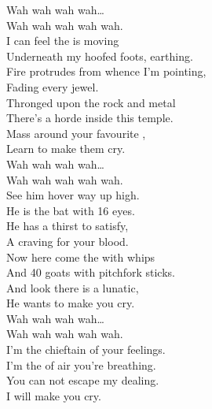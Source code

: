 


Wah wah wah wah… \\
Wah wah wah wah wah. \\

I can feel the  is moving \\
Underneath my hoofed foots, earthing. \\
Fire protrudes from whence I'm pointing, \\
Fading every jewel. \\

Thronged upon the rock and metal \\
There's a horde inside this temple. \\
Mass around your favourite , \\
Learn to make them cry. \\

Wah wah wah wah… \\
Wah wah wah wah wah. \\

See him hover way up high. \\
He is the bat with 16 eyes. \\
He has a thirst to satisfy, \\
A craving for your blood. \\

Now here come the  with whips \\
And 40 goats with pitchfork sticks. \\
And look there is a lunatic, \\
He wants to make you cry. \\

Wah wah wah wah… \\
Wah wah wah wah wah. \\

I'm the chieftain of your feelings. \\
I'm the  of air you're breathing. \\
You can not escape my dealing. \\
I will make you cry. \\



